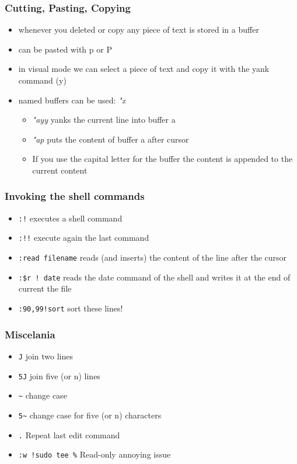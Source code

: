 \documentclass{beamer}
\begin{document}

\begin{frame}
\frametitle{Cutting, Pasting, Copying}

\begin{itemize}
\item whenever you deleted or copy any piece of text is stored in a buffer
\item can be pasted with p or P
\item in visual mode we can select a piece of text and copy it with the yank command (y)
\item named buffers can be used: \textit{"x}
\begin{itemize}
\item \textit{"ayy} yanks the current line into buffer a 
\item \textit{"ap} puts the content of buffer a after cursor
\item If you use the capital letter for the buffer the content is appended to the current content
\end{itemize}
\end{itemize}

\end{frame}



\begin{frame}
\frametitle{Invoking the shell commands}

\begin{itemize}
\item \texttt{:!} executes a shell command
\item \texttt{:!!} execute again the last command
\item \texttt{:read filename} reads (and inserts) the content of the line after the cursor
\item \texttt{:\$r ! date} reads the date command of the shell and writes it at the end of current the file
\item \texttt{:90,99!sort} sort these lines!
\end{itemize}

\end{frame}





\begin{frame}
\frametitle{Miscelania}

\begin{itemize}
\item \texttt{J} join two lines
\item \texttt{5J} join five (or n) lines
\item \texttt{\~} change case
\item \texttt{5\~} change case for five (or n) characters
\item \texttt{.} Repeat last edit command
\item \texttt{:w !sudo tee \%} Read-only annoying issue
\end{itemize}

\end{frame}
\end{document}
